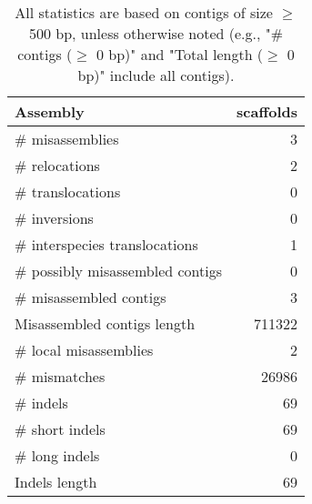 \documentclass[12pt,a4paper]{article}
\begin{document}
\begin{table}[ht]
\begin{center}
\caption{All statistics are based on contigs of size $\geq$ 500 bp, unless otherwise noted (e.g., "\# contigs ($\geq$ 0 bp)" and "Total length ($\geq$ 0 bp)" include all contigs).}
\begin{tabular}{|l*{1}{|r}|}
\hline
Assembly & scaffolds \\ \hline
\# misassemblies & 3 \\ \hline
\hspace{5mm}\# relocations & 2 \\ \hline
\hspace{5mm}\# translocations & 0 \\ \hline
\hspace{5mm}\# inversions & 0 \\ \hline
\hspace{5mm}\# interspecies translocations & 1 \\ \hline
\# possibly misassembled contigs & 0 \\ \hline
\# misassembled contigs & 3 \\ \hline
Misassembled contigs length & 711322 \\ \hline
\# local misassemblies & 2 \\ \hline
\# mismatches & 26986 \\ \hline
\# indels & 69 \\ \hline
\hspace{5mm}\# short indels & 69 \\ \hline
\hspace{5mm}\# long indels & 0 \\ \hline
Indels length & 69 \\ \hline
\end{tabular}
\end{center}
\end{table}
\end{document}
